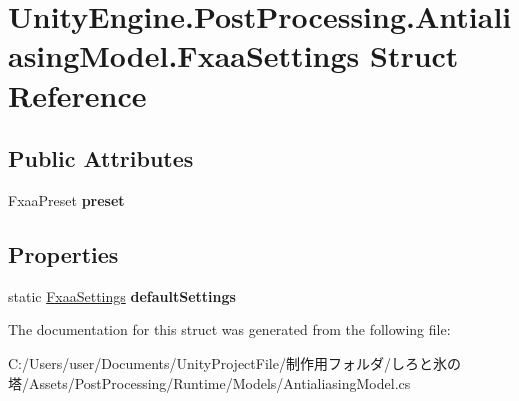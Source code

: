 \hypertarget{struct_unity_engine_1_1_post_processing_1_1_antialiasing_model_1_1_fxaa_settings}{}\section{Unity\+Engine.\+Post\+Processing.\+Antialiasing\+Model.\+Fxaa\+Settings Struct Reference}
\label{struct_unity_engine_1_1_post_processing_1_1_antialiasing_model_1_1_fxaa_settings}
\subsection*{Public Attributes}
\begin{DoxyCompactItemize}
\item 
\mbox{\label{struct_unity_engine_1_1_post_processing_1_1_antialiasing_model_1_1_fxaa_settings_a3891e742e96eb912e7557eb8c0fef920}} 
Fxaa\+Preset {\bfseries preset}
\end{DoxyCompactItemize}
\subsection*{Properties}
\begin{DoxyCompactItemize}
\item 
\mbox{\label{struct_unity_engine_1_1_post_processing_1_1_antialiasing_model_1_1_fxaa_settings_af1057b60af6b18d48a1f9df7a4de9331}} 
static \hyperlink{struct_unity_engine_1_1_post_processing_1_1_antialiasing_model_1_1_fxaa_settings}{Fxaa\+Settings} {\bfseries default\+Settings}
\end{DoxyCompactItemize}


The documentation for this struct was generated from the following file\+:\begin{DoxyCompactItemize}
\item 
C\+:/\+Users/user/\+Documents/\+Unity\+Project\+File/制作用フォルダ/しろと氷の塔/\+Assets/\+Post\+Processing/\+Runtime/\+Models/Antialiasing\+Model.\+cs\end{DoxyCompactItemize}
